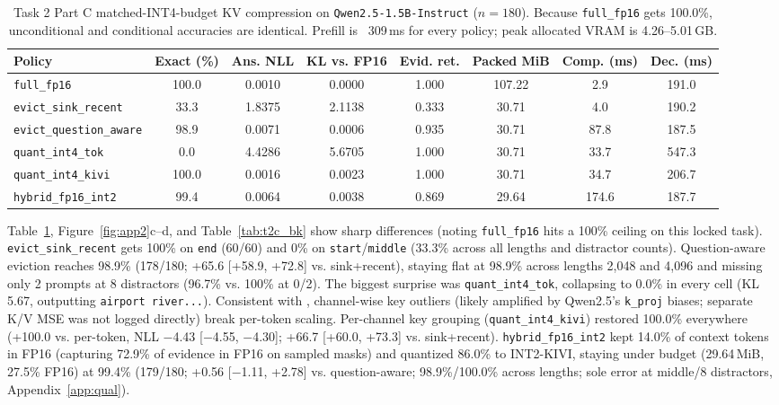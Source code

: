 \documentclass{article}
\begin{document}
\begin{table}[t]
\centering\footnotesize
\caption{Task 2 Part C matched-INT4-budget KV compression on \texttt{Qwen2.5-1.5B-Instruct} ($n=180$). Because \texttt{full\_fp16} gets 100.0\%, unconditional and conditional accuracies are identical. Prefill is ~309\,ms for every policy; peak allocated VRAM is 4.26--5.01\,GB.}
\label{tab:t2c}
\begin{tabular}{lccccccc}
\toprule
Policy & Exact (\%) & Ans. NLL & KL vs. FP16 & Evid. ret. & Packed MiB & Comp. (ms) & Dec. (ms) \\
\midrule
\texttt{full\_fp16} & 100.0 & 0.0010 & 0.0000 & 1.000 & 107.22 & 2.9 & 191.0 \\
\texttt{evict\_sink\_recent} & 33.3 & 1.8375 & 2.1138 & 0.333 & 30.71 & 4.0 & 190.2 \\
\texttt{evict\_question\_aware} & 98.9 & 0.0071 & 0.0006 & 0.935 & 30.71 & 87.8 & 187.5 \\
\texttt{quant\_int4\_tok} & 0.0 & 4.4286 & 5.6705 & 1.000 & 30.71 & 33.7 & 547.3 \\
\texttt{quant\_int4\_kivi} & 100.0 & 0.0016 & 0.0023 & 1.000 & 30.71 & 34.7 & 206.7 \\
\texttt{hybrid\_fp16\_int2} & 99.4 & 0.0064 & 0.0038 & 0.869 & 29.64 & 174.6 & 187.7 \\
\bottomrule
\end{tabular}
\end{table}

Table~\ref{tab:t2c}, Figure~\ref{fig:app2}c--d, and Table~\ref{tab:t2c_bk} show sharp differences (noting \texttt{full\_fp16} hits a 100\% ceiling on this locked task). \texttt{evict\_sink\_recent} \citep{xiao2024streamingllm} gets 100\% on \texttt{end} (60/60) and 0\% on \texttt{start}/\texttt{middle} (33.3\% across all lengths and distractor counts). Question-aware eviction \citep{zhang2023h2o,li2024snapkv} reaches 98.9\% (178/180; +65.6 [+58.9, +72.8] vs. sink+recent), staying flat at 98.9\% across lengths 2,048 and 4,096 and missing only 2 prompts at 8 distractors (96.7\% vs. 100\% at 0/2). The biggest surprise was \texttt{quant\_int4\_tok}, collapsing to 0.0\% in every cell (KL 5.67, outputting \texttt{airport river...}). Consistent with \citet{liu2024kivi}, channel-wise key outliers (likely amplified by Qwen2.5's \texttt{k\_proj} biases; separate K/V MSE was not logged directly) break per-token scaling. Per-channel key grouping (\texttt{quant\_int4\_kivi}) restored 100.0\% everywhere (+100.0 vs. per-token, NLL $-$4.43 [$-$4.55, $-$4.30]; +66.7 [+60.0, +73.3] vs. sink+recent). \texttt{hybrid\_fp16\_int2} kept 14.0\% of context tokens in FP16 (capturing 72.9\% of evidence in FP16 on sampled masks) and quantized 86.0\% to INT2-KIVI, staying under budget (29.64\,MiB, 27.5\% FP16) at 99.4\% (179/180; +0.56 [$-$1.11, +2.78] vs. question-aware; 98.9\%/100.0\% across lengths; sole error at middle/8 distractors, Appendix~\ref{app:qual}).
\end{document}
